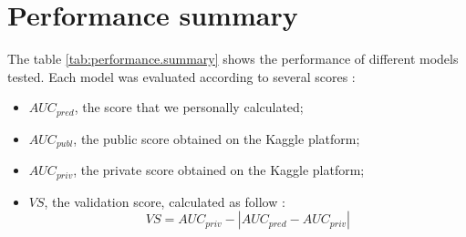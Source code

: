\section{Performance summary} \label{sec:performance}

The table \ref{tab:performance.summary} shows the performance of different models tested. Each model was evaluated according to several scores :
\begin{itemize}
    \item $AUC_{pred}$, the score that we personally calculated;
    \item $AUC_{publ}$, the public score obtained on the Kaggle platform;
    \item $AUC_{priv}$, the private score obtained on the Kaggle platform;
    \item $VS$, the validation score, calculated as follow :
    $$
    VS = AUC_{priv} - \left | AUC_{pred} - AUC_{priv} \right |
    $$
\end{itemize}
